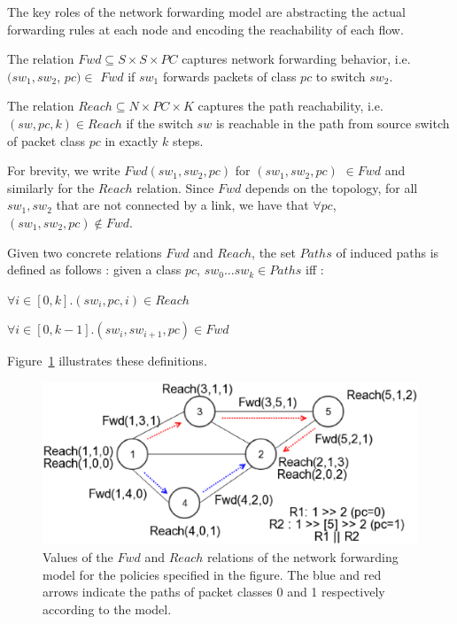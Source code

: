 The key roles of the network forwarding model are abstracting the actual forwarding rules at each node and encoding the reachability of each flow. 
\begin{mydef}
\label{def:fwd}
The relation $Fwd \subseteq S \times S \times PC $ captures network forwarding behavior, i.e. 
$(sw_1, sw_2$, $pc)\in$ $Fwd$ if 
$sw_1$ forwards packets of class $pc$ to switch $sw_2$. 
\end{mydef}
\begin{mydef}
\label{def:reach}
	The relation $Reach \subseteq N \times PC \times K$ captures the path reachability,
	i.e. $(sw, pc, k)\in Reach$ if 
	the switch $sw$ is reachable in the path from source switch of packet class $pc$ in exactly $k$ steps.  
\end{mydef}
For brevity, we write $Fwd(sw_1, sw_2, pc)$ for $(sw_1, sw_2, pc) $ $\in Fwd$ and similarly for the $Reach$ relation. 
Since $Fwd$ depends on the topology,
for all $sw_1, sw_2$ that are not connected by a link, 
we have that $\forall pc$, $(sw_1,sw_2,pc) \notin Fwd$. 

Given two concrete relations $Fwd$ and $Reach$, 
the set $Paths$ of induced paths is defined as follows :
given a class $pc$,  $sw_0 \ldots sw_k \in Paths$ iff : 
\begin{compactenumerate}
	\item $\forall i \in [0,k]. (sw_i, pc, i) \in Reach$
	\item $\forall i \in [0, k - 1]. (sw_i, sw_{i+1}, pc) \in Fwd$
\end{compactenumerate}
Figure~\ref{fig:model} illustrates these definitions.

\begin{figure}[!thb]
	\centering
	\includegraphics[width=0.8\columnwidth]{figures/network-model-example.eps}
	\caption{Values of the $Fwd$ and $Reach$ relations of the network forwarding model
		 for the policies specified in the figure. The blue and red arrows indicate the 
		 paths of packet classes 0 and 1 respectively according to the model.}
	\label{fig:model}
\end{figure}

